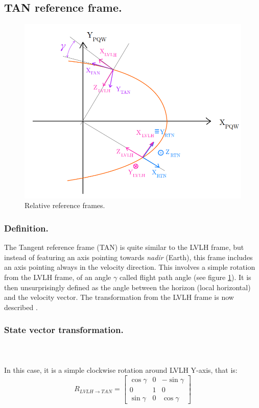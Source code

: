 	\subsection{TAN reference frame.}\label{sec:TAN_frame}
	\begin{figure}[!htb]
	\centering\includegraphics[width = 0.6\linewidth]{Appendices/Appendix_B/RTN_LVLH_TAN}
	\caption{Relative reference frames.}
	\label{fig:	RTN_LVLH_TAN}
	\end{figure}
	\FloatBarrier
		\subsubsection{Definition.}
		\indent The Tangent reference frame (TAN) is quite similar to the LVLH frame, but instead of featuring an axis pointing towards \textit{nadir} (Earth), this frame includes an axis pointing always in the velocity direction. This involves a simple rotation from the LVLH frame, of an angle $\gamma$ called flight path angle (see figure \ref{fig:	RTN_LVLH_TAN}). It is then unsurprisingly defined as the angle between the horizon (local horizontal) and the velocity vector. The transformation from the LVLH frame is now described \cite{Peters_Noomen}.
		\subsubsection{State vector transformation.}
			\paragraph{ \\}
			\indent In this case, it is a simple clockwise rotation around LVLH Y-axis, that is:
			\[
			R_{LVLH\to TAN} = \left[ \begin{array}{ccc}
			\cos\gamma 	& 0	& -\sin\gamma\\
			0 			& 1	& 0 \\
			\sin\gamma	& 0 & \cos\gamma
			\end{array}\right]
			\]
